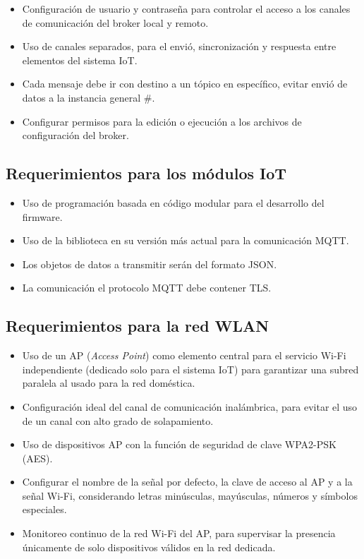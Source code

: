\begin{itemize}
\item Configuración de usuario y contraseña para controlar el acceso a los canales de comunicación del broker local y remoto.
\item Uso de canales separados, para el envió, sincronización y respuesta entre elementos del sistema IoT.
\item Cada mensaje debe ir con destino a un tópico en específico, evitar envió de datos a la instancia general \#.
\item Configurar permisos para la edición o ejecución a los archivos de configuración del broker.
\end{itemize}

\subsection{Requerimientos para los módulos IoT}

\begin{itemize}
\item Uso de programación basada en código modular para el desarrollo del firmware.
\item Uso de la biblioteca en su versión más actual para la comunicación MQTT.
\item Los objetos de datos a transmitir serán del formato JSON.
\item La comunicación el protocolo MQTT debe contener TLS.
\end{itemize}

\subsection{Requerimientos para la red WLAN}

\begin{itemize}
\item Uso de un AP (\emph{Access Point}) como elemento central para el servicio Wi-Fi independiente (dedicado solo para el sistema IoT) para garantizar una subred paralela al usado para la red doméstica.
\item Configuración ideal del canal de comunicación inalámbrica, para evitar el uso de un canal con alto grado de solapamiento.
\item Uso de dispositivos AP con la función de seguridad de clave WPA2-PSK (AES).
\item Configurar el nombre de la señal por defecto, la clave de acceso al AP y a la señal Wi-Fi, considerando letras minúsculas, mayúsculas, números y símbolos especiales.
\item Monitoreo continuo de la red Wi-Fi del AP, para supervisar la presencia únicamente de solo dispositivos válidos en la red dedicada.
\end{itemize}


